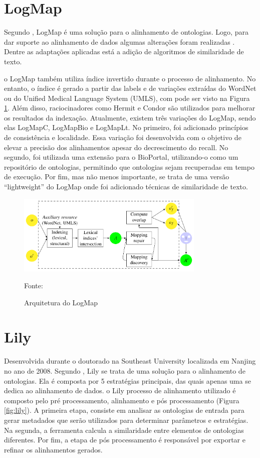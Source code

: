 \section*{LogMap}
Segundo , LogMap é uma solução para o alinhamento de ontologias. Logo, para dar suporte ao alinhamento de dados algumas alterações foram realizadas \cite{jimenez2015logmap}. Dentre as adaptações aplicadas está a adição de algoritmos de similaridade de texto.

o LogMap também utiliza índice invertido durante o processo de alinhamento. No entanto, o índice é gerado a partir das labels e de variações extraídas do WordNet ou do Unified Medical Language System (UMLS), com pode ser visto na Figura \ref{fig:logmap}. Além disso, raciocinadores como Hermit e Condor são utilizados para melhorar os resultados da indexação. 
Atualmente, existem três variações do LogMap, sendo elas LogMapC, LogMapBio e LogMapLt.  No primeiro, foi adicionado princípios de consistência e localidade. Essa variação foi desenvolvida com o objetivo de elevar a precisão dos alinhamentos apesar do decrescimento do recall. No segundo, foi utilizada uma extensão para o BioPortal, utilizando-o como um repositório de ontologias, permitindo que ontologias sejam recuperadas em tempo de execução. Por fim, mas não menos importante, se trata de uma versão “lightweight” do LogMap onde foi adicionado técnicas de similaridade de texto.

\begin{figure}[!ht]
	\centering
	\includegraphics[width=0.8\textwidth]{./imagens/logmap.png}
    \caption{Arquitetura do LogMap}
	\footnotesize{Fonte: \cite{euzenat2013d}}
	\label{fig:logmap}
\end{figure}

\section*{Lily}
Desenvolvida durante o doutorado na Southeast University localizada em Nanjing no ano de 2008. Segundo , Lily se trata de uma solução para o alinhamento de ontologias. Ela é composta por 5 estratégias principais, das quais apenas uma se dedica ao alinhamento de dados.
o Lily processo de alinhamento utilizado é composto pelo pré processamento, alinhamento e pós processamento (Figura \ref{fig:lily}).  A primeira etapa, consiste em analisar as ontologias de entrada para gerar metadados que serão utilizados para determinar parâmetros e estratégias. Na segunda, a ferramenta calcula a similaridade entre elementos de ontologias diferentes. Por fim, a etapa de pós processamento é responsável por exportar e refinar os alinhamentos gerados.

